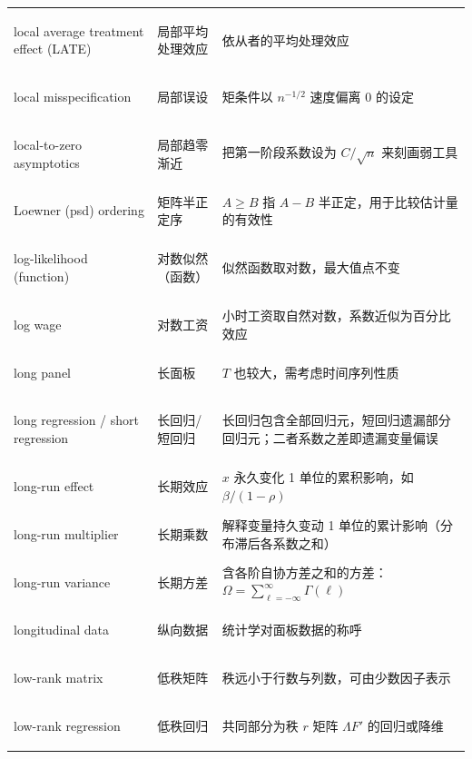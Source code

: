 \begin{longtable}{@{}>{\bfseries\boldmath\raggedright\arraybackslash}p{4.6cm}>{\raggedright\arraybackslash}p{3.2cm}>{\raggedright\arraybackslash}p{\dimexpr\textwidth-7.8cm-4\tabcolsep\relax}@{}}
local average treatment effect (LATE) & 局部平均处理效应 & 依从者的平均处理效应 \\
local misspecification & 局部误设 & 矩条件以 $n^{-1/2}$ 速度偏离 0 的设定 \\
local-to-zero asymptotics & 局部趋零渐近 & 把第一阶段系数设为 $C/\sqrt n$ 来刻画弱工具 \\
Loewner (psd) ordering & 矩阵半正定序 & $A\ge B$ 指 $A-B$ 半正定，用于比较估计量的有效性 \\
log-likelihood (function) & 对数似然（函数） & 似然函数取对数，最大值点不变 \\
log wage & 对数工资 & 小时工资取自然对数，系数近似为百分比效应 \\
long panel & 长面板 & $T$ 也较大，需考虑时间序列性质 \\
long regression / short regression & 长回归/短回归 & 长回归包含全部回归元，短回归遗漏部分回归元；二者系数之差即遗漏变量偏误 \\
long-run effect & 长期效应 & $x$ 永久变化 1 单位的累积影响，如 $\beta/(1-\rho)$ \\
long-run multiplier & 长期乘数 & 解释变量持久变动 1 单位的累计影响（分布滞后各系数之和） \\
long-run variance & 长期方差 & 含各阶自协方差之和的方差：$\Omega=\sum_{\ell=-\infty}^{\infty}\Gamma(\ell)$ \\
longitudinal data & 纵向数据 & 统计学对面板数据的称呼 \\
low-rank matrix & 低秩矩阵 & 秩远小于行数与列数，可由少数因子表示 \\
low-rank regression & 低秩回归 & 共同部分为秩 $r$ 矩阵 $\Lambda F'$ 的回归或降维 \\
\end{longtable}
\endgroup
